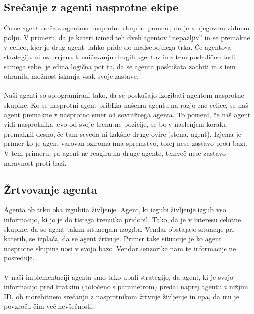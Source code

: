 \documentclass[12pt,a4paper,openany]{book}
\begin{document}
\subsection{Srečanje z agenti nasprotne ekipe}
Če se agent sreča z agentom nasprotne skupine pomeni, da je v njegovem vidnem polju. V primeru, da je kateri
izmed teh dveh agentov “nepazljiv” in se premakne v celico, kjer je drug agent, lahko pride do medsebojnega 
trka. Če agentova strategija ni usmerjena k uničevanju drugih agentov in s tem posledično tudi samega sebe, 
je edina logična pot ta, da se agenta poskušata zaobiti in s tem ohranita možnost iskanja vsak svoje zastave.\\
\\
Naši agenti so sprogramirani tako, da se poskušajo izogibati agentom nasprotne skupine. Ko se nasprotni
agent približa našemu agentu na razjo ene celice, se naš agent premakne v nasprotno smer od sovražnega agenta.
To pomeni, če naš agent vidi nasprotnika levo od svoje trenutne pozicije, se bo v naslenjem koraku premaknil desno,
če tam seveda ni kakšne druge ovire (stena, agent). Izjema je primer ko je agent varovan oziroma ima spremstvo,
torej nese zastavo proti bazi. V tem primeru, pa agent ne reagira na druge agente, temveč nese zastavo naravnost
proti bazi.


\subsection{Žrtvovanje agenta} 
Agenta ob trku oba izgubita življenje. Agent, ki izgubi življenje izgub vso informacijo, ki jo je do
tistega trenutka pridobil. Tako, da je v interesu celotne skupine, da se agent takim situacijam izogiba.
Vendar obstajajo situacije pri katerih, se izplača, da se agent žrtvuje. Primer take situacije je ko agent
nasprotne skupine nosi v svojo bazo. Vendar senzorika nam te informacije ne posreduje.\\
\\
V naši implementaciji agenta smo tako ubali strategijo, da agent, ki je svojo informacijo pred kratkim
(določeno s parametrom) predal naprej agentu z nižjim ID, ob morebitnem srečanju z nasprotnikom žrtvuje
življenje in upa, da mu je povzročil čim več nevšečnosti.
\newpage



\listoffigures

\newpage
\end{document}
